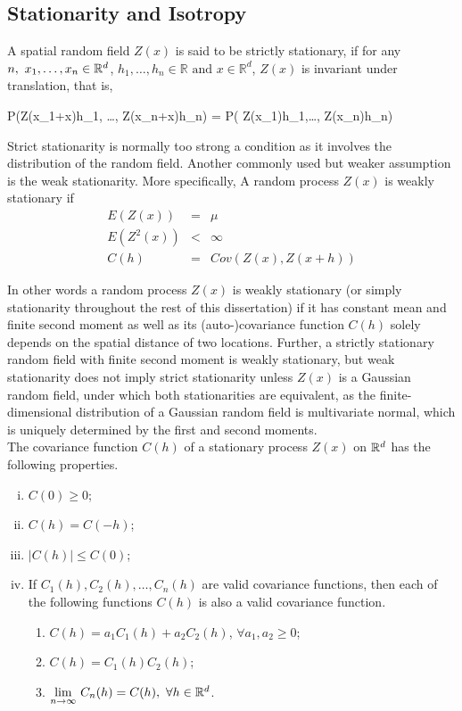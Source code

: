 \subsection{Stationarity and Isotropy}

A spatial random field $Z(x)$ is said to be strictly stationary, if for any $n,\ x_1,\ldots, x_n \in \mathbb{R}^d$, $h_1, \ldots, h_n\in\mathbb{R} \mbox{ and } x\in \mathbb{R}^d$, $Z(x)$ is invariant under translation, that is,

\beq
P(Z(x_1+x)\le h_1, \ldots, Z(x_n+x)\le h_n) = P( Z(x_1)\le h_1,\ldots, Z(x_n)\le h_n)
\eeq

Strict stationarity is normally too strong a condition as it involves the distribution of the random field. Another commonly used but weaker assumption is the weak stationarity. More specifically, A random process $Z(x)$ is weakly stationary if
\begin{eqnarray}
	E(Z(x))   & = & \mu \nonumber \\
	E(Z^2(x)) & < & \infty \nonumber \\
	C(h)      & = & Cov(Z(x),Z(x+h))
\end{eqnarray}

In other words a random process $Z(x)$ is weakly stationary (or simply stationarity throughout the rest of this dissertation) if it has constant mean and finite second moment as well as its (auto-)covariance function $C(h)$ solely depends on the spatial distance of two locations. Further, a strictly stationary random field with finite second moment is weakly stationary, but weak stationarity does not imply strict stationarity unless $Z(x)$ is a Gaussian random field, under which both stationarities are equivalent, as the finite-dimensional distribution of a Gaussian random field is multivariate normal, which is uniquely determined by the first and second moments. \\

The covariance function $C(h)$ of a stationary process $Z(x)$ on $\mathbb{R}^d$ has the following properties.

\begin{enumerate}[(i)]
	\item $C(0) \ge 0$;
	\item $C(h) = C(-h)$;
	\item $|C(h)| \le  C(0)$;
	\item If $C_1(h), C_2(h), \ldots, C_n(h)$ are valid covariance functions, then each of the following functions $C(h)$ is also a valid covariance function.
	
	      \begin{enumerate}
	      	\item $C(h) = a_1C_1(h)+a_2C_2(h)$, $\forall a_1,a_2\ge 0$;
	      	\item $C(h) = C_1(h)C_2(h)$;
	      	\item $\underset{n\to\infty} {\lim}\ C_n(h)=C(h),\ \forall h\in \R^d$.
	      \end{enumerate}
	
\end{enumerate}

